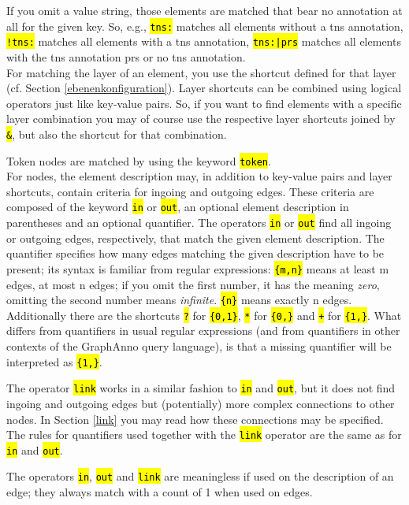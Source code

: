 \documentclass[12pt]{scrartcl}
\newcommand{\code}[1]{\hl{\texttt{#1}}}
\begin{document}
If you omit a value string, those elements are matched that bear no annotation at all for the given key. So, e.g., \code{tns:} matches all elements without a tns annotation, \code{!tns:} matches all elements with a tns annotation, \code{tns:|prs} matches all elements with the tns annotation prs or no tns annotation.\\

For matching the layer of an element, you use the shortcut defined for that layer (cf. Section \ref{ebenenkonfiguration}).
Layer shortcuts can be combined using logical operators just like key-value pairs.
So, if you want to find elements with a specific layer combination you may of course use the respective layer shortcuts joined by \code{\&}, but also the shortcut for that combination.

Token nodes are matched by using the keyword \code{token}.\\

\label{quantifiers}For nodes, the element description may, in addition to key-value pairs and layer shortcuts, contain criteria for ingoing and outgoing edges.
These criteria are composed of the keyword \code{in} or \code{out}, an optional element description in parentheses and an optional quantifier.
The operators \code{in} or \code{out} find all ingoing or outgoing edges, respectively, that match the given element description.
The quantifier specifies how many edges matching the given description have to be present; its syntax is familiar from regular expressions:
\code{\{m,n\}} means at least m edges, at most n edges; if you omit the first number, it has the meaning \textit{zero}, omitting the second number means \textit{infinite}.
\code{\{n\}} means exactly n edges.
Additionally there are the shortcuts \code{?} for \code{\{0,1\}}, \code{*} for \code{\{0,\}} and \code{+} for \code{\{1,\}}.
What differs from quantifiers in usual regular expressions (and from quantifiers in other contexts of the GraphAnno query language), is that a missing quantifier will be interpreted as \code{\{1,\}}.

The operator \code{link} works in a similar fashion to \code{in} and \code{out}, but it does not find ingoing and outgoing edges but (potentially) more complex connections to other nodes.
In Section \ref{link} you may read how these connections may be specified.
The rules for quantifiers used together with the \code{link} operator are the same as for \code{in} and \code{out}.

The operators \code{in}, \code{out} and \code{link} are meaningless if used on the description of an edge; they always match with a count of 1 when used on edges.\\
\end{document}
